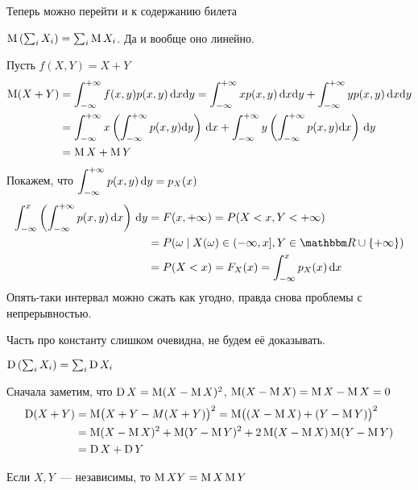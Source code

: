 \documentclass[12pt,timbord]{../../../notes}
\begin{document}
Теперь можно перейти и к содержанию билета
\begin{prop}\label{prop:stat::randsum::exp}
  $\operatorname{M} \left(\sum_i X_i\right) = \sum_i \operatorname{M} X_i $. Да и вообще оно линейно.
\end{prop}
\begin{itlproof}
  Пусть $f(X,Y)= X+Y$
  \[
    \begin{split}
      \operatorname{M} (X+Y) &= \int_{-\infty}^{+\infty} f(x,y) p(x,y)\, \mathrm{d} x\mathrm{d} y 
      = \int_{-\infty}^{+\infty} x p(x,y)\, \mathrm{d} x \mathrm{d} y + \int_{-\infty}^{+\infty} y p(x,y)\, \mathrm{d} x \mathrm{d} y \\
      &= \int_{-\infty}^{+\infty} x 
      \left(\int_{-\infty}^{+\infty} p(x,y) \mathrm{d} y\right)\, \mathrm{d} x + \int_{-\infty}^{+\infty} y \left(\int_{-\infty}^{+\infty} p(x,y) \mathrm{d} x\right)\,\mathrm{d} y \\
      &= \operatorname{M} X + \operatorname{M} Y
    \end{split}
  \]
  Покажем, что $\displaystyle\int_{-\infty}^{+\infty} p(x,y) \,\mathrm{d} y = p_X(x)$
  \[
    \begin{split}
      \int_{-\infty}^x \left(\intR p(x,y) \,\del x\right) \, \del y &= F(x, +\infty) = 
      P(X<x, Y<+\infty) \\
      &= P({\omega\mid X(\omega)\in (-\infty, x], Y\in \R\cup\{+\infty\}}) \\
      &= P(X<x) = F_X(x) = \int_{-\infty}^x p_X(x) \, \del x
    \end{split}
  \]
  Опять-таки интервал можно сжать как угодно, правда снова проблемы с непрерывностью.

  Часть про константу слишком очевидна, не будем её доказывать. 
\end{itlproof}

\begin{prop}\label{prop:stat::randsum::var}
  $\operatorname{D} \left(\sum_i X_i\right) = \sum_i \operatorname{D} X_i$
\end{prop}
\begin{itlproof}
  Сначала заметим, что $\operatorname{D} X = \operatorname{M} (X- \operatorname{M} X)^2$, $\operatorname{M} (X - \operatorname{M} X) = \operatorname{M} X - \operatorname{M} X = 0$
  \[
    \begin{split}
      \operatorname{D} (X+Y) &= \operatorname{M} \bigl(X+Y - M(X+Y)\bigr)^2 = \operatorname{M} \bigl((X-\operatorname{M} X) +(Y-\operatorname{M} Y) \bigr)^2 \\
                 &= \operatorname{M} (X-\operatorname{M} X)^2 + \operatorname{M} (Y-\operatorname{M} Y)^2 + 2 \operatorname{M} (X-\operatorname{M} X) \operatorname{M} (Y - \operatorname{M} Y)\\ 
                 &= \operatorname{D} X + \operatorname{D} Y
    \end{split}
  \]
\end{itlproof}

\begin{prop}\label{prop:stat::randsum::expmul}
  Если $X,Y$~--- независимы, то $\operatorname{M} XY = \operatorname{M} X \operatorname{M} Y$
\end{prop}
%
\end{document}
